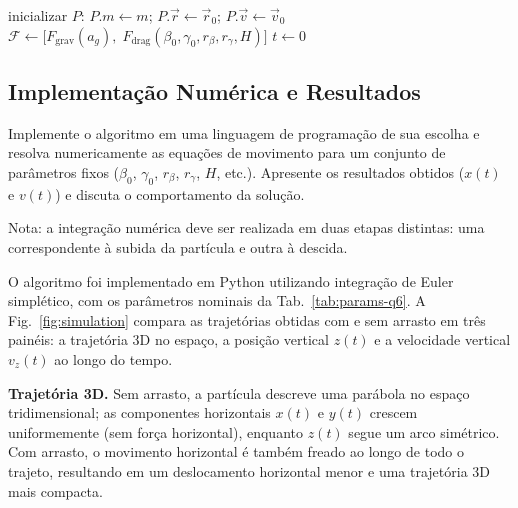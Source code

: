 \begin{algorithm}[H]
\caption{Laço de integração - \texttt{simulate\_until\_ground}}
\label{alg:euler}
\DontPrintSemicolon
{}
\BlankLine
inicializar $P$:\; $P.m \leftarrow m$;\; $P.\vec{r} \leftarrow \vec{r}_0$;\; $P.\vec{v} \leftarrow \vec{v}_0$\;
$\mathcal{F} \leftarrow \bigl[F_{\text{grav}}(a_g),\; F_{\text{drag}}(\beta_0,\gamma_0,r_\beta,r_\gamma,H)\bigr]$
$t \leftarrow 0$\;
\BlankLine
{}
\BlankLine
{}
\end{algorithm}

\subsection{Implementação Numérica e Resultados}

\begin{questao}
Implemente o algoritmo em uma linguagem de programação de sua escolha e resolva numericamente
as equações de movimento para um conjunto de parâmetros fixos ($\beta_0$, $\gamma_0$, $r_\beta$, $r_\gamma$, $H$, etc.).
Apresente os resultados obtidos ($x(t)$ e $v(t)$) e discuta o comportamento da solução.

Nota: a integração numérica deve ser realizada em duas etapas distintas: uma correspondente à subida da partícula e outra à descida.
\end{questao}

O algoritmo foi implementado em Python utilizando integração de Euler simplético, com os parâmetros nominais da Tab.~\ref{tab:params-q6}. A Fig.~\ref{fig:simulation} compara as trajetórias obtidas com e sem arrasto em três painéis: a trajetória 3D no espaço, a posição vertical $z(t)$ e a velocidade vertical $v_z(t)$ ao longo do tempo.

\textbf{Trajetória 3D.} Sem arrasto, a partícula descreve uma parábola no espaço tridimensional; as componentes horizontais $x(t)$ e $y(t)$ crescem uniformemente (sem força horizontal), enquanto $z(t)$ segue um arco simétrico. Com arrasto, o movimento horizontal é também freado ao longo de todo o trajeto, resultando em um deslocamento horizontal menor e uma trajetória 3D mais compacta.


